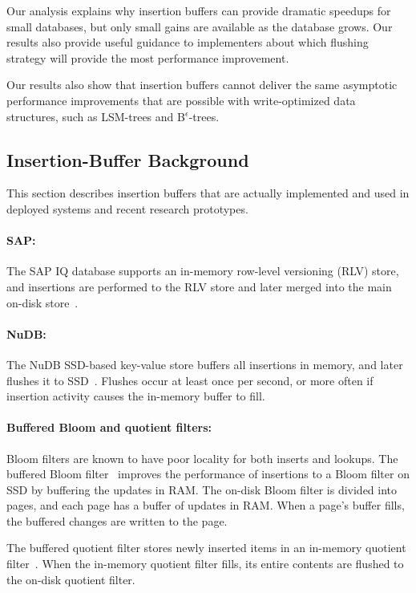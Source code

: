 Our analysis explains why insertion buffers can provide dramatic speedups for
small databases, but only small gains are available as the database grows.  Our
results also provide useful guidance to implementers about which flushing
strategy will provide the most performance improvement.

Our results also show that insertion buffers cannot deliver the same asymptotic
performance improvements that are possible with write-optimized data
structures, such as LSM-trees and B$^\epsilon$-trees.

\subsection{Insertion-Buffer Background}\label{sec:br-exp-deployed}

This section describes insertion buffers that are actually implemented and used in
deployed systems and recent research prototypes.

\paragraph{SAP:} The SAP IQ database supports an in-memory row-level versioning
(RLV) store, and insertions are performed to the RLV store and later merged
into the main on-disk store~\cite{SAP17}.  

\paragraph{NuDB:}  The NuDB SSD-based key-value store buffers all insertions in
memory, and later flushes it to SSD~\cite{NuDB16}.  Flushes occur at least once
per second, or more often if insertion activity causes the in-memory buffer to
fill.

\paragraph{Buffered Bloom and quotient filters:}  Bloom filters are known to
have poor locality for both inserts and lookups.  The buffered Bloom
filter~\cite{DBLP:conf/vldb/CanimMBLR10} improves the performance of insertions to a Bloom
filter on SSD by buffering the updates in RAM.  The on-disk Bloom filter is
divided into pages, and each page has a buffer of updates in RAM.  When a
page's buffer fills, the buffered changes are written to the page.  

The buffered quotient filter stores newly inserted items in an in-memory
quotient filter~\cite{DBLP:journals/pvldb/BenderFJKKMMSSZ12,DBLP:conf/focs/BenderFGJM018}.  When the in-memory
quotient filter fills, its entire contents are flushed to the on-disk quotient
filter.

